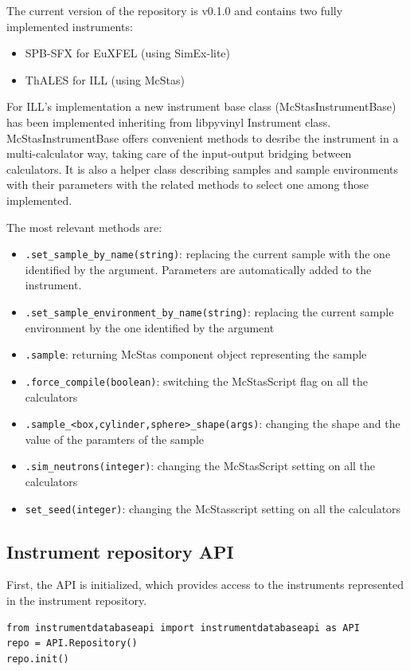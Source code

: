 \documentclass[11pt, a4paper]{article}
\begin{document}
The current version of the repository is v0.1.0 and contains two fully implemented instruments:
\begin{itemize}
 \item SPB-SFX for EuXFEL (using SimEx-lite)
\item ThALES for ILL (using McStas)
\end{itemize}

For ILL's implementation a new instrument base class (McStasInstrumentBase) has been implemented inheriting from libpyvinyl Instrument class. McStasInstrumentBase offers convenient methods to desribe the instrument in a multi-calculator way, taking care of the input-output bridging between calculators. It is also a helper class describing samples and sample environments with their parameters with the related methods to select one among those implemented.

The most relevant methods are:
\begin{itemize}
\item \verb|.set_sample_by_name(string)|: replacing the current sample with the one identified by the argument. Parameters are automatically added to the instrument.
\item \verb|.set_sample_environment_by_name(string)|: replacing the current sample environment by the one identified by the argument
\item \verb|.sample|: returning McStas component object representing the sample
\item \verb|.force_compile(boolean)|: switching the McStasScript flag on all the calculators
\item \verb|.sample_<box,cylinder,sphere>_shape(args)|: changing the shape and the value of the paramters of the sample
\item \verb|.sim_neutrons(integer)|: changing the McStasScript setting on all the calculators
\item \verb|set_seed(integer)|: changing the McStasscript setting on all the calculators
\end{itemize}

\subsection{Instrument repository API}

First, the API is initialized, which provides access to the instruments
represented in the instrument repository.
\begin{lstlisting}
from instrumentdatabaseapi import instrumentdatabaseapi as API
repo = API.Repository()
repo.init()
\end{lstlisting}
\end{document}
